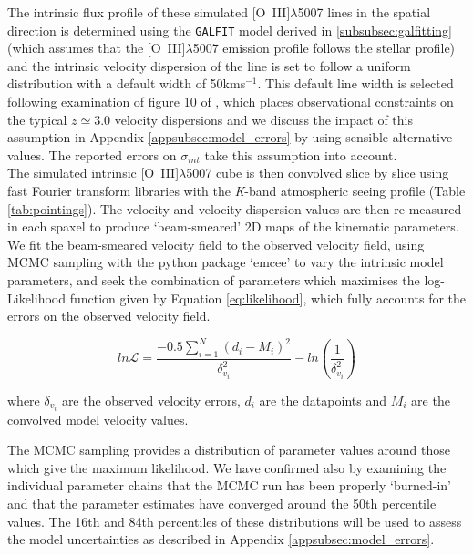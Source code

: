 \documentclass[fleqn,usenatbib]{mn2e}
\newcommand{\Lagr}{\mathcal{L}}
\begin{document}
The intrinsic flux profile of these simulated [O~{\sc III}]$\lambda$5007 lines in the spatial direction is determined using the {\tt GALFIT} model derived in \cref{subsubsec:galfitting} (which assumes that the [O~{\sc III}]$\lambda$5007 emission profile follows the stellar profile) and the intrinsic velocity dispersion of the line is set to follow a uniform distribution with a default width of 50kms$^{-1}$.
This default line width is selected following examination of figure 10 of \cite{Wisnioski2015}, which places observational constraints on the typical $z\simeq3.0$ velocity dispersions and we discuss the impact of this assumption in Appendix \ref{appsubsec:model_errors} by using sensible alternative values.
The reported errors on $\sigma_{int}$ take this assumption into account. \\

The simulated intrinsic [O~{\sc III}]$\lambda$5007 cube is then convolved slice by slice using fast Fourier transform libraries with the {\it K}-band atmospheric seeing profile (Table \ref{tab:pointings}).
The velocity and velocity dispersion values are then re-measured in each spaxel to produce `beam-smeared' 2D maps of the kinematic parameters.
We fit the beam-smeared velocity field to the observed velocity field, using MCMC sampling with the python package `emcee' \citep{Foreman-Mackey2013} to vary the intrinsic model parameters, and seek the combination of parameters which maximises the log-Likelihood function given by Equation \ref{eq:likelihood}, which fully accounts for the errors on the observed velocity field.

\begin{equation}\label{eq:likelihood}
   ln\Lagr = \frac{-0.5\sum_{i=1}^{N}(d_{i} - M_{i})^{2}}{\delta_{v_{i}}^{2}} - ln\left(\frac{1}{\delta_{v_{i}}^{2}}\right)
\end{equation}

\noindent
where $\delta_{v_{i}}$ are the observed velocity errors, $d_{i}$ are the datapoints and $M_{i}$ are the convolved model velocity values.

The MCMC sampling provides a distribution of parameter values around those which give the maximum likelihood.
We have confirmed also by examining the individual parameter chains that the MCMC run has been properly `burned-in' and that the parameter estimates have converged around the 50th percentile values.
The 16th and 84th percentiles of these distributions will be used to assess the model uncertainties as described in Appendix \ref{appsubsec:model_errors}.
\end{document}
